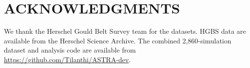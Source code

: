 \documentclass[twocolumn]{mnras}
\begin{document}
\section*{ACKNOWLEDGMENTS}

We thank the Herschel Gould Belt Survey team for the datasets. HGBS data are available from the Herschel Science Archive. The combined 2,860-simulation dataset and analysis code are available from \url{https://github.com/Tilanthi/ASTRA-dev}.



\end{document}
